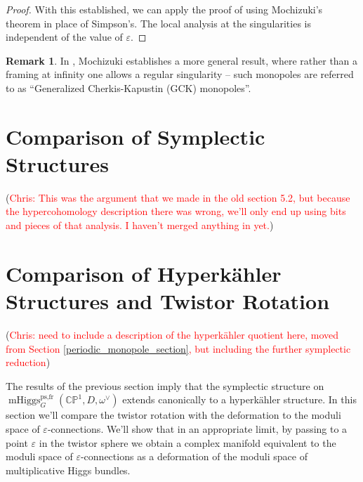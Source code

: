 \documentclass[11pt, oneside, reqno]{amsart}
\theoremstyle{definition} \newtheorem{definition}{Definition}[section]
\theoremstyle{definition} \newtheorem{remark}[definition]{Remark}
\theoremstyle{definition} \newtheorem{remarks}[definition]{Remarks}
\theoremstyle{definition} \newtheorem{question}[definition]{Question}
\theoremstyle{definition} \newtheorem*{note}{Note}
\theoremstyle{definition} \newtheorem{example}[definition]{Example}
\theoremstyle{definition} \newtheorem{examples}[definition]{Examples}
\newcommand{\bb}[1]{\mathbb{#1}}
\newcommand{\eps}{\varepsilon}
\DeclareMathOperator{\mhiggs}{mHiggs}
\newcommand{\chris}[1]{(\textcolor{red}{Chris: #1})}
\begin{document}
\begin{proof}
With this established, we can apply the proof of \cite[Proposition 5.2]{Smith} using Mochizuki's theorem in place of Simpson's.  The local analysis at the singularities is independent of the value of $\eps$.
\end{proof}

\begin{remark}
In \cite{Mochizuki}, Mochizuki establishes a more general result, where rather than a framing at infinity one allows a regular singularity -- such monopoles are referred to as ``Generalized Cherkis-Kapustin (GCK) monopoles''.
\end{remark}

\section{Comparison of Symplectic Structures}

\chris{This was the argument that we made in the old section 5.2, but because the hypercohomology description there was wrong, we'll only end up using bits and pieces of that analysis.  I haven't merged anything in yet.}

\section{Comparison of Hyperk\"ahler Structures and Twistor Rotation} \label{hyperkahler_section}
\chris{need to include a description of the hyperk\"ahler quotient here, moved from Section \ref{periodic_monopole_section}, but including the further symplectic reduction}

The results of the previous section imply that the symplectic structure on $\mhiggs_G^{\text{ps,fr}}(\bb{CP}^1,D,\omega^\vee)$ extends canonically to a hyperk\"ahler structure.  In this section we'll compare the twistor rotation with the deformation to the moduli space of $\eps$-connections. We'll show that in an appropriate limit, by passing to a point $\eps$ in the twistor sphere we obtain a complex manifold equivalent to the moduli space of $\eps$-connections as a deformation of the moduli space of multiplicative Higgs bundles.
\end{document}
